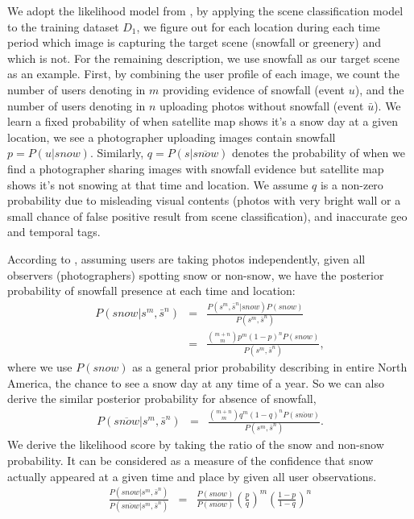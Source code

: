 We adopt the likelihood model from , by applying the scene classification model 
to the training dataset $D_1$, we figure out for each location during each time period which image
is 
capturing the target scene (snowfall or greenery) and which is not. For the remaining description, 
we use snowfall as our target scene as an example. First, by combining the 
user profile of each image, we count the number of users denoting in $m$ providing evidence of 
snowfall (event $u$), and 
the number of users denoting in $n$ uploading photos without snowfall (event $\bar{u}$). We learn a 
fixed probability of when satellite map shows it's a snow day at a given location, we see a 
photographer 
uploading images contain snowfall $p = P(u|snow)$. Similarly, $q = P(s | \overline{snow})$ denotes 
the 
probability of when we find a photographer sharing images with snowfall evidence but 
satellite map shows it's not snowing at that time and location. We assume $q$ is a non-zero probability 
due to misleading visual contents (photos with very bright wall or a small chance of false positive 
result from scene classification), and inaccurate geo and temporal tags.

According to , assuming users are taking photos independently, 
given all observers (photographers) spotting snow 
or non-snow, we have the posterior probability of snowfall presence at each time and location:
%
%
\newcommand{\smsn}{s^m, \bar{s}^n}
\newcommand{\smsntwo}{s^m, \bar{s}^n}
%
\begin{eqnarray*}
P(snow|\smsn) &=&\frac{ P(\smsn|snow)P(snow)}{P(\smsntwo)} \\
&=&\frac{{m+n\choose m}p^{m}(1-p)^{n}P(snow)}{P(\smsntwo)}, 
\end{eqnarray*}
%
where we use $P(snow)$ as a general prior probability describing in entire North America, 
the chance to see a snow day at 
any time of a year. So we can also derive the similar posterior probability for absence of snowfall,
%
\begin{eqnarray*}
P(\overline{snow}|\smsn) &=&\frac{{m+n\choose m}q^{m}(1-q)^{n}P(\overline{snow})}{P(\smsntwo)}. 
\end{eqnarray*}
%
We derive the likelihood score by taking the ratio of the snow and non-snow probability.
It can be considered as a measure of the confidence that snow actually appeared at a given time 
and place 
by given all user observations.
%
\begin{eqnarray}
\frac{P(snow|\smsn)}{P(\overline{snow}|\smsntwo)}
&=&\frac{P(snow)}{P(\overline{snow})}\left(\frac{p}{q}\right)^{m}\left(\frac{1-p}{1-q}\right)^n
\label{eq:conf}
\end{eqnarray}


